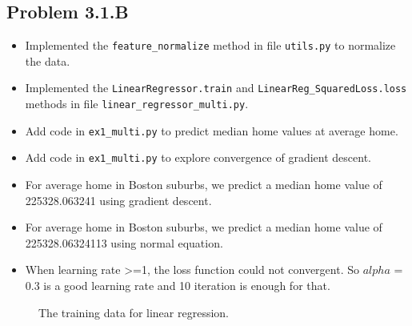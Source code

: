 \documentclass{article}
\begin{document}
\subsection{Problem 3.1.B}

\begin{itemize}
	\item Implemented the \verb|feature_normalize| method in file
	\verb|utils.py| to normalize the data. 
	\item Implemented the \verb|LinearRegressor.train| and \verb|LinearReg_SquaredLoss.loss| methods in file
	\verb|linear_regressor_multi.py|. 
	\item Add code in 	\verb|ex1_multi.py| to predict median home values at average home.
	\item Add code in 	\verb|ex1_multi.py| to explore convergence of gradient descent.
	\item For average home in Boston suburbs, we predict a median home value of 225328.063241 using gradient descent.
	\item For average home in Boston suburbs, we predict a median home value of 225328.06324113 using normal equation.
	\item When learning rate >=1, the loss function could not convergent. So $alpha$ = 0.3 is a good learning rate and 10 iteration is enough for that.
\end{itemize}

\begin{figure}[h]
	\caption{The training data for linear regression.}\label{fig:1}
\end{figure}
\end{document}
